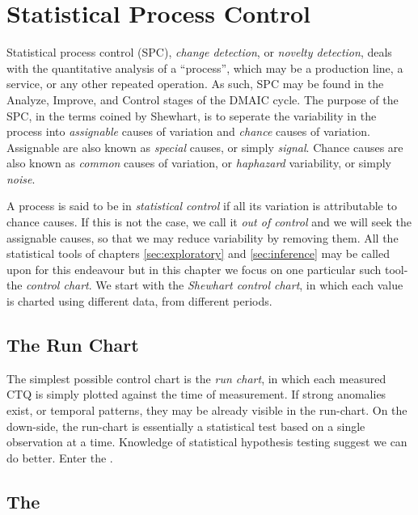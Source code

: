 \chapter[Statistical Process Control]{Statistical Process Control}
\label{sec:spc}

Statistical process control (SPC), \aka \emph{change detection}, or \emph{novelty detection}, deals with the quantitative analysis of a ``process'', which may be a production line, a service, or any other repeated operation.
As such, SPC may be found in the Analyze, Improve, and Control stages of the DMAIC cycle.
The purpose of the SPC, in the terms coined by Shewhart, is to seperate the variability in the process into \emph{assignable} causes of variation and \emph{chance} causes of variation.
Assignable are also known as \emph{special} causes, or simply \emph{signal}.
Chance causes are also known as \emph{common} causes of variation, or \emph{haphazard} variability, or simply \emph{noise}.
 
A process is said to be in \emph{statistical control} if all its variation is attributable to chance causes.
If this is not the case, we call it \emph{out of control} and we will seek the assignable causes, so that we may reduce variability by removing them.
All the statistical tools of chapters \ref{sec:exploratory} and \ref{sec:inference} may be called upon for this endeavour but in this chapter we focus on one particular such tool- the \emph{control chart}.
We start with the \emph{Shewhart control chart}, in which each value is charted using different data, from different periods. 



\section{The Run Chart}
The simplest possible control chart is the \emph{run chart}, in which each measured CTQ is simply plotted against the time of measurement.
If strong anomalies exist, or temporal patterns, they may be already visible in the run-chart.
On the down-side, the run-chart is essentially a statistical test based on a single observation at a time.
Knowledge of statistical hypothesis testing suggest we can do better. 
Enter the \barxChart. 


\section[The \barxChart]{The \barxChart}
\sectionmark{\barxChart}


